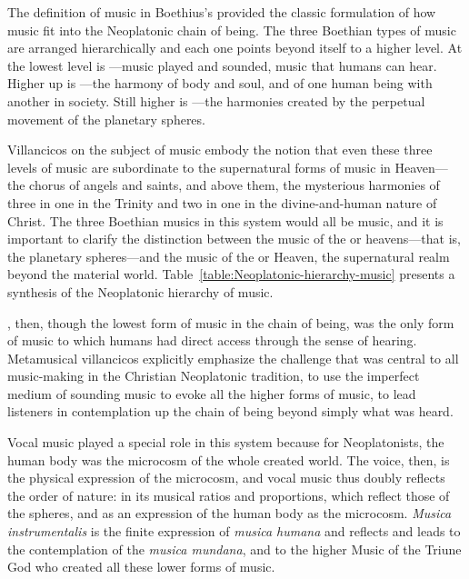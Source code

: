 The definition of music in Boethius's  provided the classic formulation of how music fit into the Neoplatonic chain of being.%
The three Boethian types of music are arranged hierarchically and each one points beyond itself to a higher level.
At the lowest level is ---music played and sounded, music that humans can hear.
Higher up is ---the harmony of body and soul, and of one human being with another in society.
Still higher is ---the harmonies created by the perpetual movement of the planetary spheres.

Villancicos on the subject of music embody the notion that even these three levels of music are subordinate to the supernatural forms of music in Heaven---the chorus of angels and saints, and above them, the mysterious harmonies of three in one in the Trinity and two in one in the divine-and-human nature of Christ.
The three Boethian musics in this system would all be  music, and it is important to clarify the distinction between the music of the  or heavens---that is, the planetary spheres---and the  music of the  or Heaven, the supernatural realm beyond the material world.
Table~\ref{table:Neoplatonic-hierarchy-music} presents a synthesis of the Neoplatonic hierarchy of  music.

%	


, then, though the lowest form of music in the chain of being, was the only form of music to which humans had direct access through the sense of hearing.
Metamusical villancicos explicitly emphasize the challenge that was central to all music-making in the Christian Neoplatonic tradition, to use the imperfect medium of sounding music to evoke all the higher forms of music, to lead listeners in contemplation up the chain of being beyond simply what was heard.

Vocal music played a special role in this system because for Neoplatonists, the human body was the microcosm of the whole created world. 
The voice, then, is the physical expression of the microcosm, and vocal music thus doubly reflects the order of nature: in its musical ratios and proportions, which reflect those of the spheres, and as an expression of the human body as the microcosm.
\emph{Musica instrumentalis} is the finite expression of \emph{musica humana} and reflects and leads to the contemplation of the \emph{musica mundana}, and to the higher Music of the Triune God who created all these lower forms of music.

